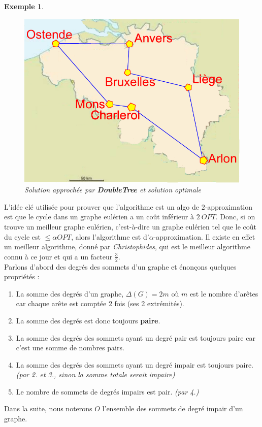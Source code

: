 \documentclass{article}
\newtheorem{exemple}{Exemple}[section]
\begin{document}
\begin{sffamily}
\begin{exemple}
\begin{figure}[h!]
\begin{center}
    \includegraphics[scale=0.5]{belgiqueOPT.pdf}
    \caption{Solution approchée par \textbf{DoubleTree} et solution optimale}
    \end{center}
\end{figure}
\end{exemple}

L'idée clé utilisée pour prouver que l'algorithme est un algo de $2$-approximation est que le cycle dans un graphe eulérien a un coût
inférieur à $2\ OPT$. Donc, si on trouve un meilleur graphe eulérien, c'est-à-dire un graphe eulérien tel que le coût du cycle est $\leq
\alpha OPT$, alors l'algorithme est d'$\alpha$-approximation. Il existe en effet un meilleur algorithme, donné par \textit{Christophides},
qui est le meilleur algorithme connu à ce jour et qui a un facteur $\frac 3 2$. \\
Parlons d'abord des degrés des sommets d'un graphe et énonçons quelques propriétés :
\begin{enumerate}
\item La somme des degrés d'un graphe, $\Delta(G) = 2m$ où $m$ est le nombre d'arêtes car chaque arête est comptée 2 fois (ses 2
extrémités).
\item La somme des degrés est donc toujours \textbf{paire}.
\item La somme des degrés des sommets ayant un degré pair est toujours paire car c'est une somme de nombres pairs.
\item La somme des degrés des sommets ayant un degré impair est toujours paire. \textit{(par 2. et 3., sinon la somme totale serait
impaire)}
\item Le nombre de sommets de degrés impairs est pair. \textit{(par 4.)}
\end{enumerate}
Dans la suite, nous noterons $O$ l'ensemble des sommets de degré impair d'un graphe.


\end{sffamily}
\end{document}
